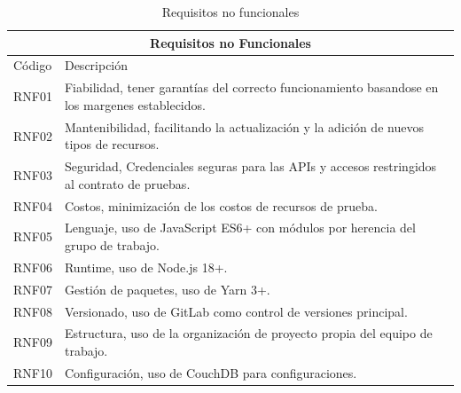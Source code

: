 \begin{table}[htbp]
    \centering
    \begin{tabular}{|p{}|p{}|}
        \hline
        \multicolumn{2}{|c|}{\textbf{Requisitos no Funcionales}}                                              \\
        \hline
        \hline
        Código & Descripción                                                                                  \\
        \hline
        RNF01  & Fiabilidad, tener garantías del correcto funcionamiento basandose en los margenes establecidos.                                     \\
        \hline
        RNF02  & Mantenibilidad, facilitando la actualización y la adición de nuevos tipos de recursos.       \\
        \hline
        RNF03  & Seguridad, Credenciales seguras para las APIs y accesos restringidos al contrato de pruebas. \\
        \hline
        RNF04  & Costos, minimización de los costos de recursos de prueba.                                    \\
        \hline
        RNF05  & Lenguaje, uso de JavaScript ES6+ con módulos por herencia del grupo de trabajo.              \\
        \hline
        RNF06  & Runtime, uso de Node.js 18+.                                                                 \\
        \hline
        RNF07  & Gestión de paquetes, uso de Yarn 3+.                                                         \\
        \hline
        RNF08  & Versionado, uso de GitLab como control de versiones principal.                               \\
        \hline
        RNF09  & Estructura, uso de la organización de proyecto propia del equipo de trabajo.                 \\
        \hline
        RNF10  & Configuración, uso de CouchDB para configuraciones.                 \\
        \hline
    \end{tabular}
    \caption{Requisitos no funcionales}
    \label{tab:requisitos-no-funcionales}
\end{table}

